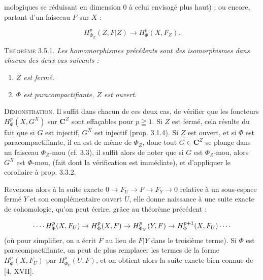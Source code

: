 
\noindent mologiques se réduisant en dimension 0 à celui envisagé plus haut) ; ou encore,
partant d'un faisceau $F$ sur $X$ :

\[
H^p_{\Phi_Z}(Z,F\vert Z)\to H^p_\Phi(X,F_Z).
\]

\indent\textsc{Théorème 3.5.1.} \textit{Les homomorphismes précédents
sont des isomorphismes dans chacun des deux cas suivants :}
\begin{enumerate}
\item \textit{$Z$ est fermé.}
\item \textit{$\Phi$ est paracompactifiante, $Z$ est ouvert.}
\end{enumerate}

\indent\textsc{Démonstration.} Il suffit dans chacun de ces deux cas, de
vérifier que les foncteurs $H^p_\Phi(X,G^X)$ sur $\mathbf C^Z$ sont effaçables pour
$p\geqq1$. Si $Z$ est fermé, cela résulte du fait que si $G$ est injectif,
$G^X$ est injectif (prop. 3.1.4). Si $Z$ est ouvert, et si $\Phi$ est
paracompactifiante, il en est de même de $\Phi_Z$, donc tout $G\in \mathbf C^Z$ se
plonge dans un faisceau $\Phi_Z$-mou (cf. 3.3), il suffit alors de noter que si
$G$ est $\Phi_Z$-mou, alors $G^X$ est $\Phi$-mou, (fait dont la vérification
est immédiate), et d'appliquer le corollaire à prop. 3.3.2.

Revenons alors à la suite exacte
$0\to F_U\to F\to F_Y\to0$
relative à un sous-espace fermé $Y$ et son complémentaire ouvert $U$, elle
donne naissance à une suite exacte de cohomologie, qu'on peut écrire, grâce au
théorème précédent :

\[
\mathinner{\cdotp\cdotp\cdotp\cdotp} H^p_\Phi(X,F_U)\to H^p_\Phi(X,F)
\to H^p_{\Phi_Y}(Y,F)\to
H^{p+1}_\Phi(X,F_U)\mathinner{\cdotp\cdotp\cdotp\cdotp}
\]
(où pour simplifier, on a écrit $F$ au lieu de $F\vert Y$ dans le troisième
terme).
Si $\Phi$ est paracompactifiante, on peut de plus remplacer les termes de la
forme $H^p_\Phi(X,F_U)$ par $H^p_{\Phi_U}(U,F)$, et on obtient alors la suite
exacte bien connue de [4, XVII].

